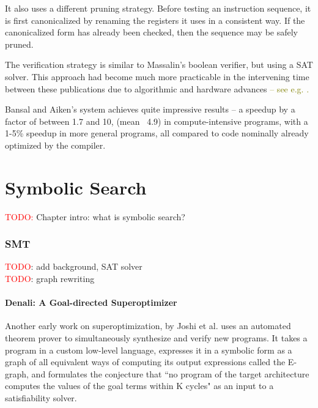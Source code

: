 \documentclass[12pt,twoside]{reedthesis}
\newcommand{\red}[1]{\textcolor{red}{#1}}
\newcommand{\green}[1]{\textcolor{olive}{#1}}
\newcommand{\addressed}[2]{{#1}}
\begin{document}
It also uses a different pruning strategy.
Before testing an instruction sequence, it is first canonicalized by renaming the registers it uses in a consistent way.
If the canonicalized form has already been checked, then the sequence may be safely pruned.
    
The verification strategy is similar to Massalin's boolean verifier, but using a SAT solver.
This approach had become much more practicable in the intervening time between these publications due to
\addressed{algorithmic and hardware advances}{If this isn't stated in the Bansal/Aiken paper then I would find a citation} 
\green{-- see e.g. \cite{silva1996grasp}.}
    
Bansal and Aiken's system achieves quite impressive results 
    -- a speedup by a factor of between 1.7 and 10, (mean ~4.9) in compute-intensive programs, with a 1-5\% speedup in more general programs, all compared to code nominally already optimized by the compiler.

\chapter{Symbolic Search}
\red{TODO:} Chapter intro: what is symbolic search?

\subsection{SMT}
    \red{TODO}: add background, SAT solver
\\  \red{TODO}: graph rewriting

\subsubsection{Denali: A Goal-directed Superoptimizer}
Another early work on superoptimization, by Joshi et al. \cite{joshi2002denali} uses an automated theorem prover to simultaneously synthesize and verify new programs.
It takes a program in a custom low-level language, expresses it in a symbolic form as a graph of all equivalent ways of computing its output expressions
    \addressed{called the E-graph}{I would be inclined to have a separate description of E-graphs, but it depends on the structure of the section},
    and formulates the conjecture that ``no program of the target architecture computes the values of the goal terms within K cycles"
        \addressed{as an input to a satisfiability solver}{I would reorganize slightly so that this comes right before the explanation below}. 
    
\end{document}
